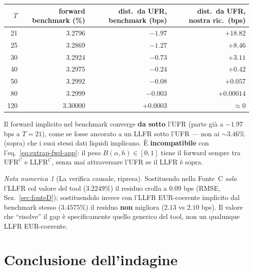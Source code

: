 \documentclass[11pt,a4paper]{article}
\theoremstyle{definition}
\theoremstyle{remark}
\newtheorem*{attenzione}{Nota numerica}
\newcommand{\UFR}{\mathrm{UFR}}
\newcommand{\LLFR}{\mathrm{LLFR}}
\begin{document}
\begin{center}\small
\renewcommand{\arraystretch}{1.15}
\begin{tabular}{rrrr}
\toprule
$T$ & forward benchmark (\%) & dist.\ da UFR, benchmark (bps) & dist.\ da UFR, nostra ric.\ (bps) \\
\midrule
21  & 3.2796 & $-1.97$   & $+18.82$ \\
25  & 3.2869 & $-1.27$   & $+8.46$ \\
30  & 3.2924 & $-0.73$   & $+3.11$ \\
40  & 3.2975 & $-0.24$   & $+0.42$ \\
50  & 3.2992 & $-0.08$   & $+0.057$ \\
80  & 3.2999 & $-0.003$  & $+0.00014$ \\
120 & 3.30000 & $+0.0003$ & $\approx 0$ \\
\bottomrule
\end{tabular}
\end{center}

Il forward implicito nel benchmark converge \textbf{da sotto} l'UFR (parte gi\`a a $-1.97$ bps
a $T=21$), come se fosse ancorato a un LLFR sotto l'UFR --- non ai $\sim3.46\%$ (sopra) che i
suoi stessi dati liquidi implicano. \`E \textbf{incompatibile} con l'eq.~\eqref{eq:extrap-fwd-app}:
il peso $B(\alpha,h)\in[0,1]$ tiene il forward sempre tra $\UFR^C$ e $\LLFR^C$, senza mai
attraversare l'UFR se il LLFR \`e sopra.

\begin{attenzione}[La verifica causale, ripresa]
Sostituendo nella Fonte~C \emph{solo} l'LLFR col valore del tool ($3.2249\%$) il residuo crolla
a $0.09$ bps (RMSE, Sez.~\ref{sec:fonteD}); sostituendolo invece con l'LLFR EUR-coerente
implicito dal benchmark stesso ($3.4575\%$) il residuo \textbf{non} migliora ($2.13$ vs $2.10$
bps). Il valore che ``risolve'' il gap \`e specificamente quello generico del tool, non un
qualunque LLFR EUR-coerente.
\end{attenzione}

\section{Conclusione dell'indagine}
\label{sec:conclusione}
\end{document}
